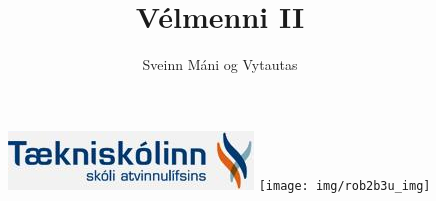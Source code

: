 \documentclass{article}
\begin{document}
\title{Vélmenni II}
\author{Sveinn Máni og Vytautas}
\maketitle
\begin{figure}[h]
\centering
\includegraphics[scale=.65]{img/tskoli}
\texttt{[image: img/rob2b3u\_img]}
\end{figure}
\newpage
\tableofcontents
\newpage



\newpage



\newpage



\newpage

\end{document}
